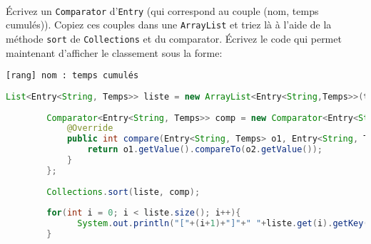 \documentclass[iutinfo,a4paper,nocorrections,10pt]{ustl-tdtp}
\begin{document}
~\\ \question Écrivez un \texttt{Comparator} d'\texttt{Entry} (qui correspond au couple (nom, temps cumulés)). Copiez ces couples dans une \texttt{ArrayList} et triez là à l'aide de la méthode \texttt{sort} de \texttt{Collections} et du comparator. Écrivez le code qui permet maintenant d'afficher le classement sous la forme:

\begin{verbatim}
[rang] nom : temps cumulés
\end{verbatim}


\begin{correction}
{\color{red}
\begin{lstlisting}[language=Java]
        List<Entry<String, Temps>> liste = new ArrayList<Entry<String,Temps>>(tempsCumules.entrySet());
        
        Comparator<Entry<String, Temps>> comp = new Comparator<Entry<String,Temps>>() {
            @Override
            public int compare(Entry<String, Temps> o1, Entry<String, Temps> o2) {
                return o1.getValue().compareTo(o2.getValue());
            }
        };
        
        Collections.sort(liste, comp);
        
        for(int i = 0; i < liste.size(); i++){
        	  System.out.println("["+(i+1)+"]"+" "+liste.get(i).getKey()+" : "+liste.get(i).getValue());
        }

\end{lstlisting}
} 
\end{correction}
\end{document}
